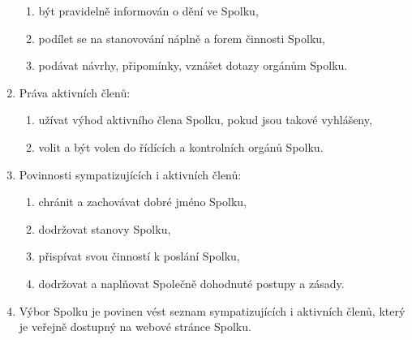 \documentclass[11pt,a4paper]{article}
\begin{document}
\begin{enumerate}[itemsep=0pt]
\begin{enumerate}[itemsep=0pt,topsep=0pt]
        \item být pravidelně informován o dění ve Spolku,
        \item podílet se na stanovování náplně a forem činnosti Spolku,
        \item podávat návrhy, připomínky, vznášet dotazy orgánům Spolku.
    \end{enumerate}
    \item Práva aktivních členů:
    \begin{enumerate}[itemsep=0pt,topsep=0pt]
        \item užívat výhod aktivního člena Spolku, pokud jsou takové vyhlášeny,
        \item volit a být volen do řídících a kontrolních orgánů Spolku.
    \end{enumerate}
    \item Povinnosti sympatizujících i aktivních členů:
    \begin{enumerate}[itemsep=0pt,topsep=0pt]
        \item chránit a zachovávat dobré jméno Spolku,
        \item dodržovat stanovy Spolku,
        \item přispívat svou činností k poslání Spolku,
        \item dodržovat a naplňovat Společně dohodnuté postupy a zásady.
    \end{enumerate}
    \item Výbor Spolku je povinen vést seznam sympatizujících i aktivních členů,
    který je veřejně dostupný na webové stránce Spolku. 
\end{enumerate}
\end{document}
